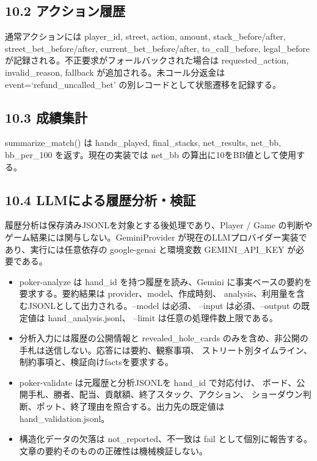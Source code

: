 \documentclass[
]{article}
\begin{document}
\subsection{10.2
アクション履歴}\label{ux30a2ux30afux30b7ux30e7ux30f3ux5c65ux6b74}

通常アクションには player\_id, street, action, amount,
stack\_before/after, street\_bet\_before/after,
current\_bet\_before/after, to\_call\_before, legal\_before
が記録される。不正要求がフォールバックされた場合は requested\_action,
invalid\_reason, fallback が追加される。未コール分返金は
event=`refund\_uncalled\_bet' の別レコードとして状態遷移を記録する。

\subsection{10.3 成績集計}\label{ux6210ux7e3eux96c6ux8a08}

summarize\_match() は hands\_played, final\_stacks, net\_results,
net\_bb, bb\_per\_100 を返す。現在の実装では net\_bb
の算出に10をBB値として使用する。

\subsection{10.4 LLMによる履歴分析・検証}

履歴分析は保存済みJSONLを対象とする後処理であり、Player / Game
の判断やゲーム結果には関与しない。GeminiProvider
が現在のLLMプロバイダー実装であり、実行には任意依存の google-genai
と環境変数 GEMINI\_API\_KEY が必要である。

\begin{itemize}
\item
  poker-analyze は hand\_id を持つ履歴を読み、Gemini
  に事実ベースの要約を要求する。要約結果は provider、model、作成時刻、
  analysis、利用量を含むJSONLとして出力される。--model は必須、
  --input は必須、--output の既定値は hand\_analysis.jsonl、
  --limit は任意の処理件数上限である。
\item
  分析入力には履歴の公開情報と revealed\_hole\_cards
  のみを含め、非公開の手札は送信しない。応答には要約、観察事項、
  ストリート別タイムライン、制約事項と、検証向けfactsを要求する。
\item
  poker-validate は元履歴と分析JSONLを hand\_id で対応付け、
  ボード、公開手札、勝者、配当、貢献額、終了スタック、アクション、
  ショーダウン判断、ポット、終了理由を照合する。出力先の既定値は
  hand\_validation.jsonl。
\item
  構造化データの欠落は not\_reported、不一致は fail
  として個別に報告する。文章の要約そのものの正確性は機械検証しない。
\end{itemize}
\end{document}
